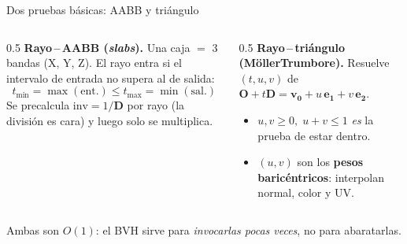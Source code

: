 \documentclass[aspectratio=169,11pt]{beamer}
\newcommand{\vecm}[1]{\mathbf{#1}}
\newcommand{\hl}[1]{{\color{primdk}\textbf{#1}}}
\begin{document}
\begin{frame}{Dos pruebas b\'asicas: AABB y tri\'angulo}
\begin{columns}[T]
\begin{column}{0.5\textwidth}
\textbf{Rayo\,--\,AABB (\emph{slabs}).} Una caja $=$ 3 bandas (X, Y, Z). El rayo
entra si el intervalo de entrada no supera al de salida:
\[
t_{\min}=\max(\text{ent.})\le t_{\max}=\min(\text{sal.})
\]
Se precalcula $\mathrm{inv}=1/\vecm{D}$ por rayo (la divisi\'on es cara) y luego
solo se multiplica.
\end{column}
\begin{column}{0.5\textwidth}
\textbf{Rayo\,--\,tri\'angulo (M\"oller\textendash Trumbore).} Resuelve
$(t,u,v)$ de $\vecm{O}+t\vecm{D}=\vecm{v_0}+u\,\vecm{e_1}+v\,\vecm{e_2}$.
\begin{itemize}\itemsep1pt
  \item $u,v\ge0,\;u{+}v\le1$ \emph{es} la prueba de estar dentro.
  \item $(u,v)$ son los \hl{pesos baric\'entricos}: interpolan normal, color y UV.
\end{itemize}
\end{column}
\end{columns}
\vspace{12pt}
\centering\footnotesize\textcolor{mute}{Ambas son $O(1)$: el BVH sirve para \emph{invocarlas pocas veces}, no para abaratarlas.}
\end{frame}
\end{document}
